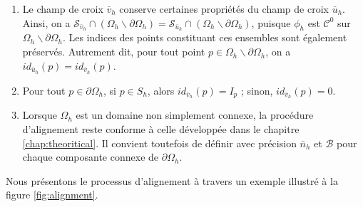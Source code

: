 \begin{remark}
\[\]
\vspace{-1cm}
\begin{enumerate}
\item Le champ de croix $\bar{v}_h$ conserve certaines propriétés du champ de croix $\bar{u}_h$. Ainsi, on a $\mathcal{S}_{\bar{v}_h}\cap(\Omega_h\backslash\partial\Omega_h)=\mathcal{S}_{\bar{u}_h}\cap(\Omega_h\backslash\partial\Omega_h)$, puisque $\phi_h$ est $\mathcal{C}^0$ sur $\Omega_h\backslash\partial\Omega_h$. Les indices des points constituant ces ensembles sont également préservés. Autrement dit, pour tout point $p\in\Omega_h\backslash\partial\Omega_h$, on a $id_{\bar{u}_h}(p)=id_{\bar{v}_h}(p)$.
\item Pour tout $p\in\partial\Omega_h$, si $p\in S_h$, alors $id_{\bar{v}_h}(p)=I_p$ ; sinon, $id_{\bar{v}_h}
(p)=0$.
\item Lorsque $\Omega_h$ est un domaine non simplement connexe, la procédure d'alignement reste conforme à celle développée dans le chapitre \ref{chap:theoritical}. Il convient toutefois de définir avec précision $\bar{n}_h$ et $\mathcal{B}$ pour chaque composante connexe de $\partial\Omega_h$.
\end{enumerate}
\end{remark}
Nous présentons le processus d'alignement à travers un exemple illustré à la figure \ref{fig:alignment}.

